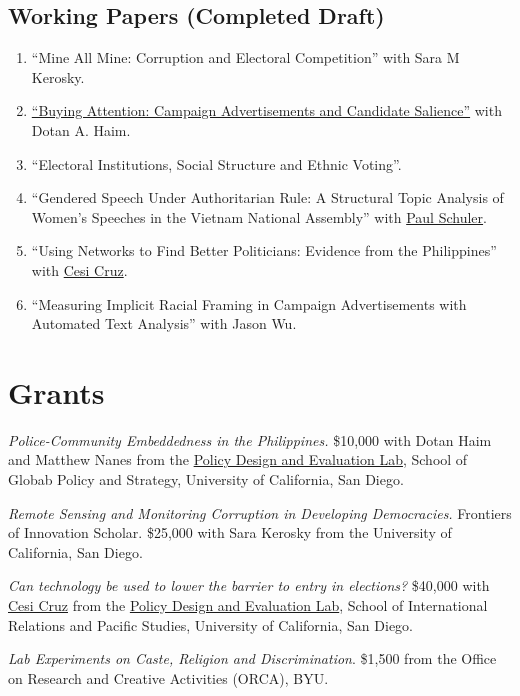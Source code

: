 \documentclass[letterpaper]{article}
\renewenvironment{itemize}{
  \begin{list}{}{
    \setlength{\leftmargin}{1.5em}
  }
}{
  \end{list}
}
\begin{document}
\subsection*{Working Papers (Completed Draft)}

\begin{enumerate}
\item ``Mine All Mine: Corruption and Electoral Competition'' with Sara M Kerosky.

\item \href{http://polisci2.ucsd.edu/mwdavidson/Davidson-Haim_Buying%20Attention-Campaign%20Advertisements%20and%20Candidate%20Salience.pdf}{``Buying Attention: Campaign Advertisements and Candidate Salience''} with Dotan A. Haim.

\item ``Electoral Institutions, Social Structure and Ethnic Voting''.

\item ``Gendered Speech Under Authoritarian Rule: A Structural Topic Analysis of Women's Speeches in the Vietnam National Assembly'' with \href{http://polisci2.ucsd.edu/pschuler/}{Paul Schuler}.


\item ``Using Networks to Find Better Politicians: Evidence from the Philippines'' with \href{http://cesicruz.com/}{Cesi Cruz}.


\item ``Measuring Implicit Racial Framing in Campaign Advertisements with Automated Text Analysis'' with Jason Wu.
\end{enumerate}

\section*{Grants}
\begin{itemize}
\item \emph{Police-Community Embeddedness in the Philippines.} \$10,000 with Dotan Haim and Matthew Nanes from the \href{http://pdel.ucsd.edu/}{Policy Design and Evaluation Lab}, School of Globab Policy and Strategy, University of California, San Diego.

\item \emph{Remote Sensing and Monitoring Corruption in Developing Democracies.} Frontiers of Innovation Scholar. \$25,000 with Sara Kerosky from the University of California, San Diego. 

\item \emph{Can technology be used to lower the barrier to entry in elections?} \$40,000 with \href{http://cesicruz.com/}{Cesi Cruz} from the \href{http://pdel.ucsd.edu/}{Policy Design and Evaluation Lab}, School of International Relations and Pacific Studies, University of California, San Diego.

\item \emph{Lab Experiments on Caste, Religion and Discrimination}. \$1,500 from the Office on Research and Creative Activities (ORCA), BYU.   
\end{itemize}
\end{document}
